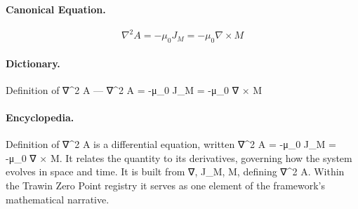 \paragraph{Canonical Equation.}
\[
\nabla^2 A = -\mu_0 J_M = -\mu_0 \nabla \times M
\]

\paragraph{Dictionary.}
Definition of ∇\textasciicircum{}2 A — ∇\textasciicircum{}2 A = -μ\_0 J\_M = -μ\_0 ∇ × M

\paragraph{Encyclopedia.}
Definition of ∇\textasciicircum{}2 A is a differential equation, written ∇\textasciicircum{}2 A = -μ\_0 J\_M = -μ\_0 ∇ × M. It relates the quantity to its derivatives, governing how the system evolves in space and time. It is built from ∇, J\_M, M, defining ∇\textasciicircum{}2 A. Within the Trawin Zero Point registry it serves as one element of the framework's mathematical narrative.
